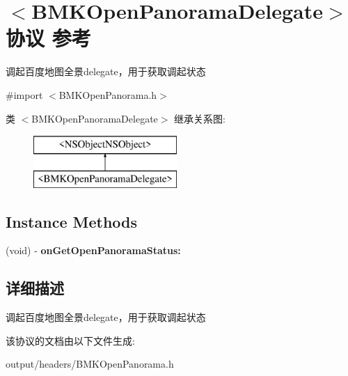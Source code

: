 \hypertarget{protocol_b_m_k_open_panorama_delegate-p}{}\section{$<$B\+M\+K\+Open\+Panorama\+Delegate$>$协议 参考}
\label{protocol_b_m_k_open_panorama_delegate-p}


调起百度地图全景delegate，用于获取调起状态  




{\ttfamily \#import $<$B\+M\+K\+Open\+Panorama.\+h$>$}

类 $<$B\+M\+K\+Open\+Panorama\+Delegate$>$ 继承关系图\+:\begin{figure}[H]
\begin{center}
\leavevmode
\includegraphics[height=2.000000cm]{protocol_b_m_k_open_panorama_delegate-p}
\end{center}
\end{figure}
\subsection*{Instance Methods}
\begin{DoxyCompactItemize}
\item 
\hypertarget{protocol_b_m_k_open_panorama_delegate-p_ab61b614642d51e414c6c49596ff08d3d}{}(void) -\/ {\bfseries on\+Get\+Open\+Panorama\+Status\+:}\label{protocol_b_m_k_open_panorama_delegate-p_ab61b614642d51e414c6c49596ff08d3d}

\end{DoxyCompactItemize}


\subsection{详细描述}
调起百度地图全景delegate，用于获取调起状态 

该协议的文档由以下文件生成\+:\begin{DoxyCompactItemize}
\item 
output/headers/B\+M\+K\+Open\+Panorama.\+h\end{DoxyCompactItemize}
